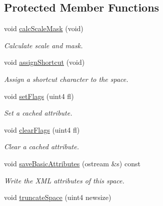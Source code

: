 \subsection*{Protected Member Functions}
\begin{DoxyCompactItemize}
\item 
void \mbox{\hyperlink{class_addr_space_af61640170c0baa861bbacee0e5c22a31}{calc\+Scale\+Mask}} (void)
\begin{DoxyCompactList}\small\item\em Calculate scale and mask. \end{DoxyCompactList}\item 
void \mbox{\hyperlink{class_addr_space_a7ffd0df8a2d71013ec0a9b572bd549d9}{assign\+Shortcut}} (void)
\begin{DoxyCompactList}\small\item\em Assign a shortcut character to the space. \end{DoxyCompactList}\item 
void \mbox{\hyperlink{class_addr_space_a3dd14c033be519525d486fcbc94a2bf7}{set\+Flags}} (uint4 fl)
\begin{DoxyCompactList}\small\item\em Set a cached attribute. \end{DoxyCompactList}\item 
void \mbox{\hyperlink{class_addr_space_a523bc5940337efda7c00745c06c4346f}{clear\+Flags}} (uint4 fl)
\begin{DoxyCompactList}\small\item\em Clear a cached attribute. \end{DoxyCompactList}\item 
void \mbox{\hyperlink{class_addr_space_a7acbe22e2d26a7e70ef09fdfa646e9af}{save\+Basic\+Attributes}} (ostream \&s) const
\begin{DoxyCompactList}\small\item\em Write the X\+ML attributes of this space. \end{DoxyCompactList}\item 
void \mbox{\hyperlink{class_addr_space_a84ecacea771a34c4349d1f31272316c7}{truncate\+Space}} (uint4 newsize)
\end{DoxyCompactItemize}
